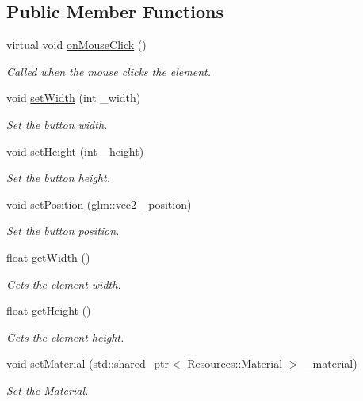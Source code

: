 \subsection*{Public Member Functions}
\begin{DoxyCompactItemize}
\item 
virtual void \hyperlink{class_cookie_eng_1_1_components_1_1_g_u_i_1_1_u_i_element_a4f36d5a491837291d4e948a84dd13831}{on\+Mouse\+Click} ()
\begin{DoxyCompactList}\small\item\em Called when the mouse clicks the element. \end{DoxyCompactList}\item 
void \hyperlink{class_cookie_eng_1_1_components_1_1_g_u_i_1_1_u_i_element_a46bc04453a376a064875588280fa1df9}{set\+Width} (int \+\_\+width)
\begin{DoxyCompactList}\small\item\em Set the button width. \end{DoxyCompactList}\item 
void \hyperlink{class_cookie_eng_1_1_components_1_1_g_u_i_1_1_u_i_element_a80afbcb678173b1ebc1c3eb4e2004af2}{set\+Height} (int \+\_\+height)
\begin{DoxyCompactList}\small\item\em Set the button height. \end{DoxyCompactList}\item 
void \hyperlink{class_cookie_eng_1_1_components_1_1_g_u_i_1_1_u_i_element_ae491a0874fb7f77a4c1f83341b87f0fa}{set\+Position} (glm\+::vec2 \+\_\+position)
\begin{DoxyCompactList}\small\item\em Set the button position. \end{DoxyCompactList}\item 
float \hyperlink{class_cookie_eng_1_1_components_1_1_g_u_i_1_1_u_i_element_acdc4fde6beefd27ba19a41b5260abf79}{get\+Width} ()
\begin{DoxyCompactList}\small\item\em Gets the element width. \end{DoxyCompactList}\item 
float \hyperlink{class_cookie_eng_1_1_components_1_1_g_u_i_1_1_u_i_element_a99062d7b0db29f366d7b16a63f83db6f}{get\+Height} ()
\begin{DoxyCompactList}\small\item\em Gets the element height. \end{DoxyCompactList}\item 
void \hyperlink{class_cookie_eng_1_1_components_1_1_g_u_i_1_1_u_i_element_abcac765bc6a76f435ef4a45d2a717097}{set\+Material} (std\+::shared\+\_\+ptr$<$ \hyperlink{class_cookie_eng_1_1_resources_1_1_material}{Resources\+::\+Material} $>$ \+\_\+material)
\begin{DoxyCompactList}\small\item\em Set the Material. \end{DoxyCompactList}\end{DoxyCompactItemize}
